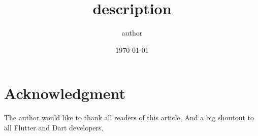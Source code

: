 \documentclass[11pt, a4paper]{article}
\title{{ description }}
\author{{ author }}
\date{\today}
\begin{document}
    \maketitle

    \begin{abstract}
        \lipsum[1-1]
    \end{abstract}
    
    

    

    

    \section*{Acknowledgment}
    The author would like to thank all readers of this article. And a big shoutout to all Flutter and Dart developers.

    
    
\end{document}
